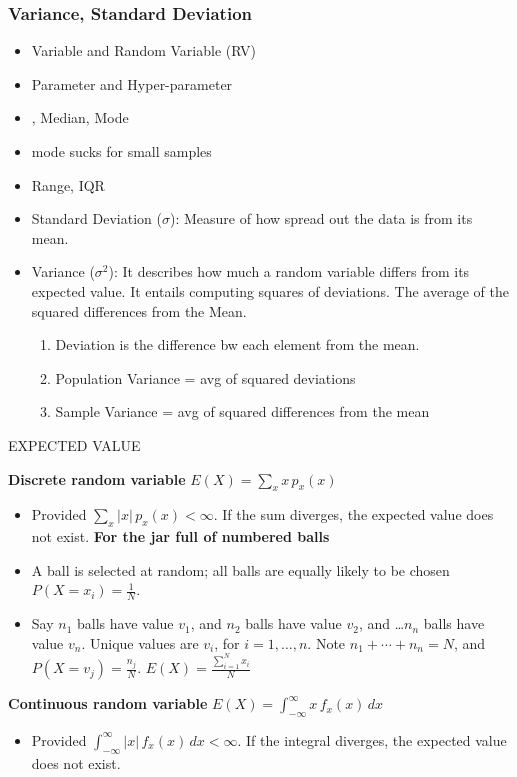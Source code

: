 \documentclass{beamer}
\begin{document}
\begin{frame}\frametitle{Variance, Standard Deviation} 
\begin{itemize}
	\item Variable and Random Variable (RV)
	\item Parameter and Hyper-parameter
	\item \hyperlink{meanlabel}{}, Median, Mode
	\item mode sucks for small samples
	\item Range, IQR
	\item Standard Deviation ($\sigma$): Measure of how spread out the data is from its mean.
	\item Variance ($\sigma^2$): It describes how much a random variable differs from its expected value. It entails computing squares of deviations. The average of the squared differences from the Mean.\\
	\begin{enumerate}
		\item Deviation is the difference bw each element from the mean.\\
		\item Population Variance = avg of squared deviations\\
		\item Sample Variance = avg of squared differences from the mean
	\end{enumerate}
\end{itemize}
\end{frame}

\begin{frame}
\hypertarget{meanlabel}{EXPECTED VALUE}\newline
\textbf{Discrete random variable}	$E(X) = \sum_x x \, p_x(x)$
\begin{itemize}
\item Provided $\sum_x |x| \, p_x(x) < \infty$. If the sum diverges, the expected value does not exist. 
\textbf{For the jar full of numbered balls}
\item A ball is selected at random; all balls are equally likely to be chosen $P(X = x_i) = \frac{1}{N}$.
\item Say $n_1$ balls have value $v_1$, and $n_2$ balls have value $v_2$, and \ldots  $n_n$ balls have value $v_n$. Unique values are $v_i$, for $i=1, \ldots, n$. Note $n_1 + \cdots + n_n = N$, and $P(X=v_j) = \frac{n_j}{N}$. 
$E(X) = \frac{\sum_{i=1}^N x_i}{N}$

\end{itemize}

\textbf{Continuous random variable}  $E(X) = \int_{-\infty}^\infty x \, f_x(x) \, dx$

\begin{itemize}
\item Provided $ \int_{-\infty}^\infty |x| \, f_x(x) \, dx < \infty$. If the integral diverges, the expected value does not exist. 

\end{itemize}

\end{frame}
\end{document}
